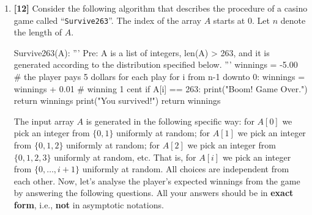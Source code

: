 \documentclass{assignment-263}
\begin{document}
\begin{enumerate}
\item \textbf{[12]}
		Consider the following algorithm that describes the procedure of a
		casino game called ``\texttt{Survive263}''. The index of the array $A$ starts
		at $0$. Let $n$ denote the length of $A$.

\begin{python}
   Survive263(A):
      '''
      Pre: A is a list of integers, len(A) > 263, and it is generated 
           according to the distribution specified below.
      '''
      winnings = -5.00   # the player pays 5 dollars for each play
      for i from n-1 downto 0:
         winnings = winnings + 0.01  # winning 1 cent
         if A[i] == 263:
            print("Boom! Game Over.")
            return winnings
      print("You survived!")
      return winnings
\end{python}

		The input array $A$ is generated in the following specific way: for
		$A[0]$ we pick an integer from $\{0, 1\}$ uniformly at random; for
		$A[1]$ we pick an integer from $\{0, 1, 2\}$ uniformly at random;
		for $A[2]$ we pick an integer from $\{0, 1, 2, 3\}$ uniformly at
		random, etc. That is, for $A[i]$ we pick  an integer from
		$\{0,\ldots, i+1\}$ uniformly at random. All choices are independent
		from each other. Now, let's analyse the player's expected winnings
		from the game by answering the following questions. 
		All your answers
		should be in \textbf{exact form}, i.e., \textbf{not} in asymptotic
		notations.

		\begin{enumerate}[(a)]


\end{enumerate}
\end{enumerate}
\end{document}

